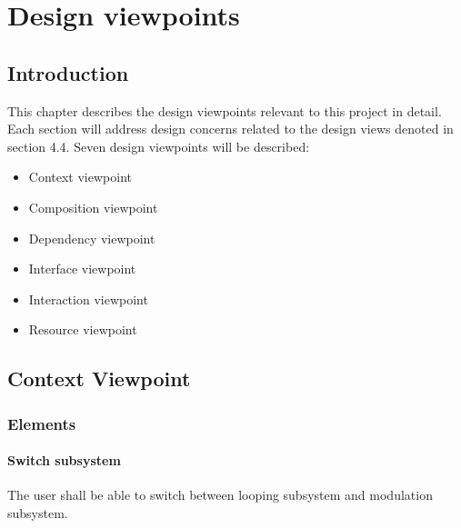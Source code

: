 \section{Design viewpoints}

\subsection{Introduction}
    This chapter describes the design viewpoints relevant to this project in detail. Each section will address design concerns related to the design views denoted in section 4.4. Seven design viewpoints will be described:
    \begin{itemize}
        \item Context viewpoint
        \item Composition viewpoint
        \item Dependency viewpoint
        \item Interface viewpoint
        \item Interaction viewpoint
        \item Resource viewpoint
    \end{itemize}

\subsection{Context Viewpoint}
    
        
    \subsubsection{Elements}
        \paragraph{Switch subsystem}
           The user shall be able to switch between looping subsystem and modulation subsystem.
          
